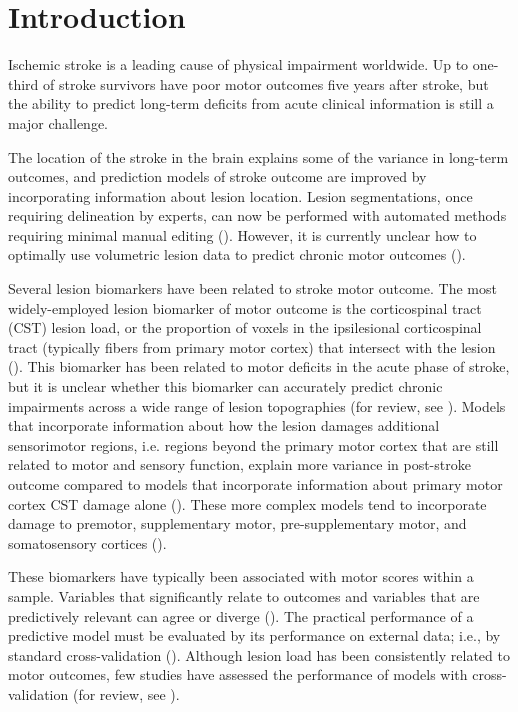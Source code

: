 \documentclass[10pt]{article}
\begin{document}
\section{Introduction}
Ischemic stroke is a leading cause of physical impairment worldwide. Up to one-third of stroke survivors have poor motor outcomes five years after stroke, but the ability to predict long-term deficits from acute clinical information is still a major challenge.

The location of the stroke in the brain explains some of the variance in long-term outcomes, and prediction models of stroke outcome are improved by incorporating information about lesion location. Lesion segmentations, once requiring  delineation by experts, can now be performed with automated methods requiring minimal manual editing (\cite{Pustina2016-qu}). However, it is currently unclear how to optimally use volumetric lesion data to predict chronic motor outcomes (\cite{Sperber2020-kp, Kasties2021-rm}). 

Several lesion biomarkers have been related to stroke motor outcome. The most widely-employed lesion biomarker of motor outcome is the corticospinal tract (CST) lesion load, or the proportion of voxels in the ipsilesional corticospinal tract (typically fibers from primary motor cortex) that intersect with the lesion (\cite{Zhu2010-qh, Feng2015-du}). This biomarker has been related to motor deficits in the acute phase of stroke, but it is unclear whether this biomarker can accurately predict chronic impairments across a wide range of lesion topographies (for review, see \cite{Kim2017-xe}). Models that incorporate information about how the lesion damages additional sensorimotor regions, i.e. regions beyond the primary motor cortex that are still related to motor and sensory function, explain more variance in post-stroke outcome compared to models that incorporate information about primary motor cortex CST damage alone (\cite{Ito2022-em, Sperber2021-lw, Rondina2016-ds, Rondina2017-ij, Schulz2012-yy}). These more complex models tend to incorporate damage to premotor, supplementary motor, pre-supplementary motor, and somatosensory cortices (\cite{Ito2022-em,Schulz2012-yy, Sperber2021-lw, Rondina2016-ds, Rondina2017-ij}). 

These biomarkers have typically been associated with motor scores within a sample. Variables that significantly relate to outcomes and variables that are predictively relevant can agree or diverge (\cite{Bzdok2020-py}). The practical performance of a predictive model must be evaluated by its performance on external data; i.e., by standard cross-validation (\cite{Hastie2001-or}). Although lesion load has been consistently related to motor outcomes, few studies have assessed the performance of models with cross-validation (for review, see \cite{Kim2017-xe}).
\end{document}
